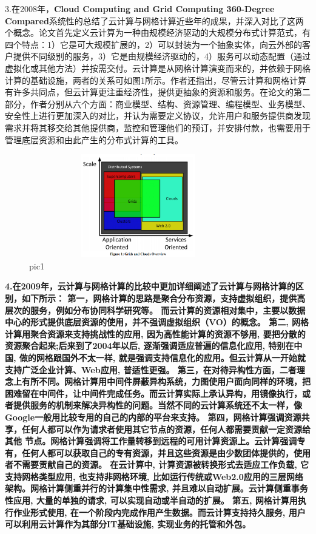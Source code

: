 \documentclass[a4paper,twoside]{scrbook}
\begin{document}
3.在2008年，\textbf{Cloud Computing and Grid Computing 360-Degree Compared}系统性的总结了云计算与网格计算近些年的成果，并深入对比了这两个概念。论文首先定义云计算为一种由规模经济驱动的大规模分布式计算范式，有四个特点：1）它是可大规模扩展的，2）可以封装为一个抽象实体，向云外部的客户提供不同级别的服务，3）它是由规模经济驱动的，4）服务可以动态配置（通过虚拟化或其他方法）并按需交付。云计算是从网格计算演变而来的，并依赖于网格计算的基础设施，两者的关系可如图1所示。作者还指出，尽管云计算和网格计算有许多共同点，但云计算更注重经济性，提供更抽象的资源和服务。在论文的第二部分，作者分别从六个方面：商业模型、结构、资源管理、编程模型、业务模型、安全性上进行更加深入的对比，并认为需要定义协议，允许用户和服务提供商发现需求并将其移交给其他提供商，监控和管理他们的预订，并安排付款，也需要用于管理底层资源和由此产生的分布式计算的工具。
\begin{figure}
\centering %
\includegraphics[height=4.5cm,width=9.5cm]{compared.png}
\caption{pic1}
\end{figure}

\textbf{4.在2009年，\textbf{云计算与网格计算的比较}中更加详细阐述了云计算与网格计算的区别，如下所示：
第一，网格计算的思路是聚合分布资源，支持虚拟组织，提供高层次的服务，例如分布协同科学研究等。 而云计算的资源相对集中，主要以数据中心的形式提供底层资源的使用，并不强调虚拟组织（VO）的概念。
第二, 网格计算用聚合资源来支持挑战性的应用, 因为高性能计算的资源不够用, 要把分散的资源聚合起来;后来到了2004年以后, 逐渐强调适应普遍的信息化应用, 特别在中国, 做的网格跟国外不太一样, 就是强调支持信息化的应用。但云计算从一开始就支持广泛企业计算、Web应用, 普适性更强。
第三，在对待异构性方面，二者理念上有所不同。网格计算用中间件屏蔽异构系统，力图使用户面向同样的环境，把困难留在中间件，让中间件完成任务。而云计算实际上承认异构，用镜像执行，或者提供服务的机制来解决异构性的问题。当然不同的云计算系统还不太一样，像Google一般用比较专用的自己的内部的平台来支持。
第四，网格计算强调资源共享，任何人都可以作为请求者使用其它节点的资源，任何人都需要贡献一定资源给其他 节点。网格计算强调将工作量转移到远程的可用计算资源上。云计算强调专有，任何人都可以获取自己的专有资源，并且这些资源是由少数团体提供的，使用者不需要贡献自己的资源。
在云计算中, 计算资源被转换形式去适应工作负载, 它支持网格类型应用, 也支持非网格环境, 比如运行传统或Web2.0应用的三层网络架构。网格计算侧重并行的计算集中性需求, 并且难以自动扩展。云计算侧重事务性应用, 大量的单独的请求, 可以实现自动或半自动的扩展。
第五, 网格计算用执行作业形式使用, 在一个阶段内完成作用产生数据。而云计算支持持久服务, 用户可以利用云计算作为其部分IT基础设施, 实现业务的托管和外包。}
\end{document}
